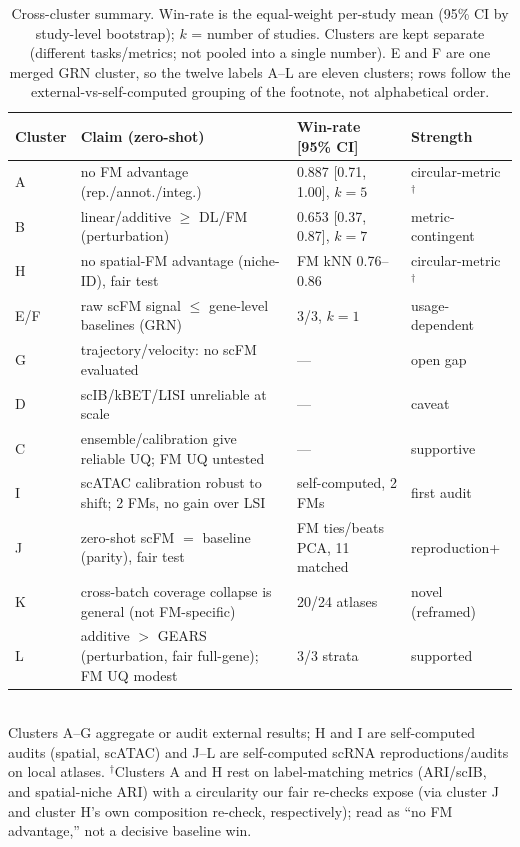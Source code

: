 \documentclass[fleqn,10pt,lineno]{wlpeerj}  %
\begin{document}
\begin{table}[!ht]\centering\footnotesize
\caption{Cross-cluster summary. Win-rate is the equal-weight per-study mean (95\% CI by study-level bootstrap); $k$ = number of studies. Clusters are kept separate (different tasks/metrics; not pooled into a single number). E and F are one merged GRN cluster, so the twelve labels A--L are eleven clusters; rows follow the external-vs-self-computed grouping of the footnote, not alphabetical order.}
\label{tab:clusters}
\begin{tabular}{@{}l p{6.1cm} p{3.1cm} l@{}}
\toprule
Cluster & Claim (zero-shot) & Win-rate [95\% CI] & Strength \\
\midrule
A & no FM advantage (rep./annot./integ.) & 0.887 [0.71, 1.00], $k{=}5$ & circular-metric$^\dagger$ \\
B & linear/additive $\geq$ DL/FM (perturbation) & 0.653 [0.37, 0.87], $k{=}7$ & metric-contingent \\
H & no spatial-FM advantage (niche-ID), fair test & FM kNN 0.76--0.86 & circular-metric$^\dagger$ \\
E/F & raw scFM signal $\leq$ gene-level baselines (GRN) & 3/3, $k{=}1$ & usage-dependent \\
G & trajectory/velocity: no scFM evaluated & --- & open gap \\
D & scIB/kBET/LISI unreliable at scale & --- & caveat \\
C & ensemble/calibration give reliable UQ; FM UQ untested & --- & supportive \\
I & scATAC calibration robust to shift; 2 FMs, no gain over LSI & self-computed, 2 FMs & first audit \\
\midrule
J & zero-shot scFM $=$ baseline (parity), fair test & FM ties/beats PCA, 11 matched & reproduction+ \\
K & cross-batch coverage collapse is general (not FM-specific) & 20/24 atlases & novel (reframed) \\
L & additive $>$ GEARS (perturbation, fair full-gene); FM UQ modest & 3/3 strata & supported \\
\bottomrule
\end{tabular}
\\[2pt]
\footnotesize Clusters A--G aggregate or audit external results; H and I are self-computed audits (spatial, scATAC) and J--L are self-computed scRNA reproductions/audits on local atlases. $^\dagger$Clusters A and H rest on label-matching metrics (ARI/scIB, and spatial-niche ARI) with a circularity our fair re-checks expose (via cluster J and cluster H's own composition re-check, respectively); read as ``no FM advantage,'' not a decisive baseline win.
\end{table}
\end{document}
